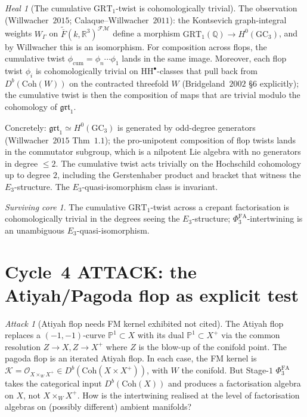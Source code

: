 \documentclass[11pt]{article}
\theoremstyle{definition}
\theoremstyle{remark}
\newtheorem{attack}[theorem]{Attack}
\newtheorem{heal}[theorem]{Heal}
\newtheorem{survivor}[theorem]{Surviving core}
\providecommand{\FMbar}{\overline{F}}
\providecommand{\FM}{\mathcal{FM}}
\providecommand{\PhiFA}{\Phi^{\mathrm{FA}}}
\providecommand{\Coh}{\mathrm{Coh}}
\providecommand{\FM}{\mathrm{FM}}
\providecommand{\cK}{\mathcal{K}}
\providecommand{\cO}{\mathcal{O}}
\providecommand{\HH}{\mathrm{HH}}
\providecommand{\RR}{\mathbb{R}}
\providecommand{\QQ}{\mathbb{Q}}
\providecommand{\PP}{\mathbb{P}}
\providecommand{\GRT}{\mathrm{GRT}}
\begin{document}
\begin{heal}[The cumulative $\GRT_1$-twist is cohomologically trivial]
\label{heal:a-cycle-3}
The observation (Willwacher~$2015$; Calaque--Willwacher~$2011$): the
Kontsevich graph-integral weights $W_\Gamma$ on
$\widetilde{\FMbar}(k,\RR^3)^{\FM}$ define a morphism
$\GRT_1(\QQ) \to H^0(\mathrm{GC}_3)$, and by Willwacher this is an
isomorphism. For composition across flops, the cumulative twist
$\phi_{\mathrm{cum}} = \phi_n \cdots \phi_1$ lands in the same image.
Moreover, each flop twist $\phi_i$ is cohomologically trivial on
$\HH^\bullet$-classes that pull back from $D^b(\Coh(W))$ on the
contracted threefold $W$ (Bridgeland~$2002$ \S$6$ explicitly); the
cumulative twist is then the composition of maps that are trivial
modulo the cohomology of $\mathfrak{grt}_1$.

Concretely: $\mathfrak{grt}_1 \simeq H^0(\mathrm{GC}_3)$ is generated
by odd-degree generators (Willwacher~$2015$ Thm~$1.1$); the pro-unipotent
composition of flop twists lands in the commutator subgroup, which is
a nilpotent Lie algebra with no generators in degree $\leq 2$. The
cumulative twist acts trivially on the Hochschild cohomology up to
degree $2$, including the Gerstenhaber product and bracket that
witness the $E_3$-structure. The $E_3$-quasi-isomorphism class is
invariant.
\end{heal}

\begin{survivor}
The cumulative $\GRT_1$-twist across a crepant factorisation is
cohomologically trivial in the degrees seeing the $E_3$-structure;
$\PhiFA_3$-intertwining is an unambiguous $E_3$-quasi-isomorphism.
\end{survivor}

\section{Cycle~4 ATTACK: the Atiyah/Pagoda flop as explicit test}

\begin{attack}[Atiyah flop needs FM kernel exhibited not cited]
\label{att:a-cycle-4}
The Atiyah flop replaces a $(-1,-1)$-curve $\PP^1 \subset X$ with its
dual $\PP^1 \subset X^+$ via the common resolution
$Z \to X, Z \to X^+$ where $Z$ is the blow-up of the conifold point.
The pagoda flop is an iterated Atiyah flop. In each case, the FM
kernel is $\cK = \cO_{X \times_W X^+} \in D^b(\Coh(X \times X^+))$,
with $W$ the conifold. But Stage-$1$ $\PhiFA_3$ takes the categorical
input $D^b(\Coh(X))$ and produces a factorisation algebra on $X$, not
$X \times_W X^+$. How is the intertwining realised at the level of
factorisation algebras on (possibly different) ambient manifolds?
\end{attack}
\end{document}
